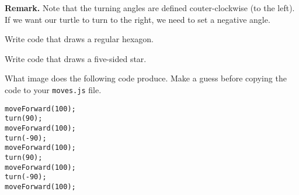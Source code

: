 \documentclass[english,11pt,a4paper]{report}
\begin{document}
{\bf Remark.} Note that the turning angles are defined couter-clockwise (to the left). If we want our turtle to turn to the right, we need to set a negative angle.

\begin{ex}\label{ex17}
\begin{multicols}{2}
Write code that draws a regular hexagon.

\end{multicols}
\end{ex}

\begin{ex}\label{ex18}
\begin{multicols}{2}
Write code that draws a five-sided star. 

\end{multicols}
\end{ex}

\begin{ex}\label{ex19}
What image does the following code produce. Make a guess before copying the code to your \verb|moves.js| file.
\begin{verbatim}
moveForward(100);
turn(90);
moveForward(100);
turn(-90);
moveForward(100);
turn(90);
moveForward(100);
turn(-90);
moveForward(100);
\end{verbatim}
\end{ex}
\end{document}
